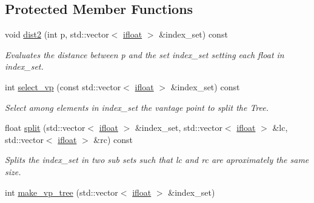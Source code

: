 \subsection*{Protected Member Functions}
\begin{DoxyCompactItemize}
\item 
\hypertarget{classtree_1_1cpu_1_1vp__tree_a1610ad0a015eb7634590fab15eddc464}{}void \hyperlink{classtree_1_1cpu_1_1vp__tree_a1610ad0a015eb7634590fab15eddc464}{dist2} (int p, std\+::vector$<$ \hyperlink{types_8hpp_a4b0dedd1120697012e61e312aa7058a8}{ifloat} $>$ \&index\+\_\+set) const \label{classtree_1_1cpu_1_1vp__tree_a1610ad0a015eb7634590fab15eddc464}

\begin{DoxyCompactList}\small\item\em Evaluates the distance between p and the set index\+\_\+set setting each float in index\+\_\+set. \end{DoxyCompactList}\item 
int \hyperlink{classtree_1_1cpu_1_1vp__tree_acba29bccad136acc95faf4be2929f207}{select\+\_\+vp} (const std\+::vector$<$ \hyperlink{types_8hpp_a4b0dedd1120697012e61e312aa7058a8}{ifloat} $>$ \&index\+\_\+set) const 
\begin{DoxyCompactList}\small\item\em Select among elements in index\+\_\+set the vantage point to split the Tree. \end{DoxyCompactList}\item 
float \hyperlink{classtree_1_1cpu_1_1vp__tree_a1959d61a75183d3f37a6923c382174bb}{split} (std\+::vector$<$ \hyperlink{types_8hpp_a4b0dedd1120697012e61e312aa7058a8}{ifloat} $>$ \&index\+\_\+set, std\+::vector$<$ \hyperlink{types_8hpp_a4b0dedd1120697012e61e312aa7058a8}{ifloat} $>$ \&lc, std\+::vector$<$ \hyperlink{types_8hpp_a4b0dedd1120697012e61e312aa7058a8}{ifloat} $>$ \&rc) const 
\begin{DoxyCompactList}\small\item\em Splits the index\+\_\+set in two sub sets such that lc and rc are aproximately the same size. \end{DoxyCompactList}\item 
\hypertarget{classtree_1_1cpu_1_1vp__tree_ae8deb69c56e005e07a663872042ac5f2}{}int \hyperlink{classtree_1_1cpu_1_1vp__tree_ae8deb69c56e005e07a663872042ac5f2}{make\+\_\+vp\+\_\+tree} (std\+::vector$<$ \hyperlink{types_8hpp_a4b0dedd1120697012e61e312aa7058a8}{ifloat} $>$ \&index\+\_\+set)\label{classtree_1_1cpu_1_1vp__tree_ae8deb69c56e005e07a663872042ac5f2}


\end{DoxyCompactItemize}
